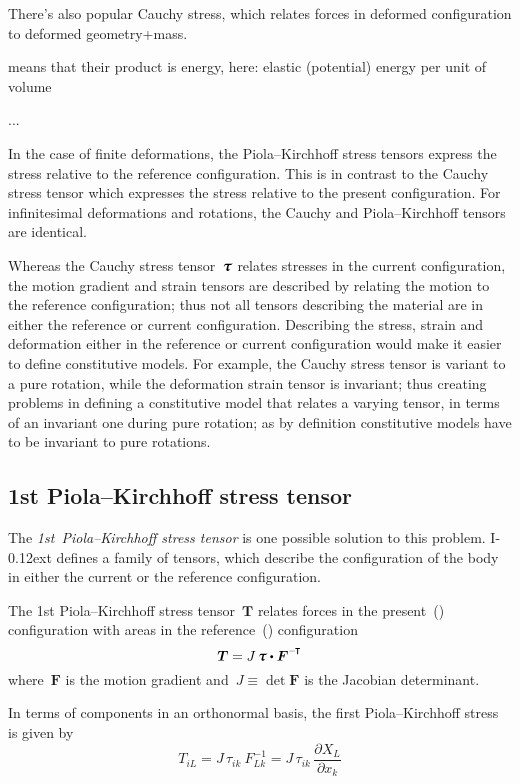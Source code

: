There’s also popular Cauchy stress, which relates forces in deformed configuration to deformed geometry+mass.

 means that their product is energy, here: elastic (potential) energy per unit of volume


...


{\small
In the case of finite deformations, the Piola\hbox{--}Kirchhoff stress tensors express the stress relative to the reference configuration. This is in contrast to the Cauchy stress tensor which expresses the stress relative to the present configuration. For infinitesimal deformations and rotations, the Cauchy and Piola\hbox{--}Kirchhoff tensors are identical.

Whereas the Cauchy stress tensor~${\cauchystress}$ relates stresses in the current configuration, the motion gradient and strain tensors are described by relating the motion to the reference configuration; thus not all tensors describing the material are in either the reference or current configuration. Describing the stress, strain and deformation either in the reference or current configuration would make it easier to define constitutive models. For example, the Cauchy stress tensor is variant to a pure rotation, while the deformation strain tensor is invariant; thus creating problems in defining a constitutive model that relates a varying tensor, in terms of an invariant one during pure rotation; as by definition constitutive models have to be invariant to pure rotations.

\subsection*{1st Piola\hbox{--}Kirchhoff stress tensor}

The \emph{1st~Piola\hbox{--}Kirchhoff stress tensor} is one possible solution to this problem. I\kern-0.12ext defines a family of tensors, which describe the configuration of the body in either the current or the reference configuration.

The 1st Piola\hbox{--}Kirchhoff stress tensor~$\bm{T}$ relates forces in the present~() configuration with areas in the reference~() configuration
\[
\bm{T} = J \, \cauchystress \dotp \bm{F}^{\expminusT}
\]
where~$\bm{F}$ is the motion gradient and~${J \equiv \operatorname{det} \bm{F}}$ is the Jacobian determinant.

In terms of components in an orthonormal basis, the first Piola\hbox{--}Kirchhoff stress is given by
\[
T_{iL} = J \, \tau_{ik}~F_{Lk}^{-1} = J \, \tau_{ik} \, \frac{\partial X_{L}}{\partial x_{k}}
\]

}
